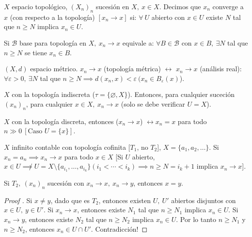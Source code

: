 \documentclass[a4paper]{report}
\begin{document}
	\begin{definition}
		$X$ espacio topológico, $(X_n)_n$ sucesión en $X,\ x \in X$. Decimos que $x_n$ converge a $x$ (con respecto a la topología) $[x_n \to x]$ si: $\forall \ U$ abierto con $x\in U$ existe $N$ tal que $n\geq N$ implica $x_n \in U$.
	\end{definition}

	\begin{note}
		Si $\mathcal{B}$ base para topología en $X,\ x_n \to x$ equivale a: $\forall B \in \mathcal{B}$ con $x \in B, \ \exists N$ tal que $n\geq N$ se tiene $x_n \in B$.
	\end{note}

	\begin{eg}
		$(X,d)$ espacio métrico. $x_n \to x$ (topología métrica) $\longleftrightarrow$ $x_n \to x$ (análisis real): $\forall \varepsilon > 0,\ \exists N$ tal que $n \geq N \implies d(x_n,x)<\varepsilon \ (x_n \in B_{\varepsilon} (x)$). 
	\end{eg}

	\begin{eg}
		$X$ con la topología indiscreta ($\tau = \{\varnothing, X\}$). Entonces, para cualquier suceción $(x_n)_n$, para cualquier $x \in X, \ x_n \to x$ (solo se debe verificar $U = X$).  
	\end{eg}

	\begin{eg}
		$X$ con la topología discreta, entonces ($x_n \to x$) $\longleftrightarrow x_n = x$ para todo $n\gg 0 \ [\text{Caso } U=\{x\}]$. 
	\end{eg}

	\begin{eg}
		$X$ infinito contable con topología cofinita [$T_1$, no $T_2$], $X = \{ a_1, a_2, \dots \}$. Si $x_n = a_n \implies x_n \to x$ para todo $x \in X$ [Si $U$ abierto, $x \in U \not\implies U = X \setminus \{a_{i_1},\dots, a_{i_k} \} (i_1<\cdots<i_k) \implies n \geq N = i_k + 1$ implica $x_n \to x$].   
	\end{eg}

	\begin{lemma}
		Si $T_2,\ (x_n)_n$ sucesión con $x_n \to x,\ x_n \to y$, entonces $x = y$.
	\end{lemma}

	\begin{proof}[Proof ]
		Si $x \neq y$, dado que es $T_2$, entonces existen $U,\ U'$ abiertos disjuntos con $x \in U,\ y \in U'$. Si $x_n \to x$, entonces existe $N_1$ tal que $n \geq N_1$ implica $x_n \in U$. Si $x_n \to y$, entonces existe $N_2$ tal que $n\geq N_2$ implica $x_n \in U$. Por lo tanto $n \geq N_1$ y $n \geq N_2$, entonces $x_n \in U \cap U'$. Contradicción! \textreferencemark
	\end{proof}
\end{document}
